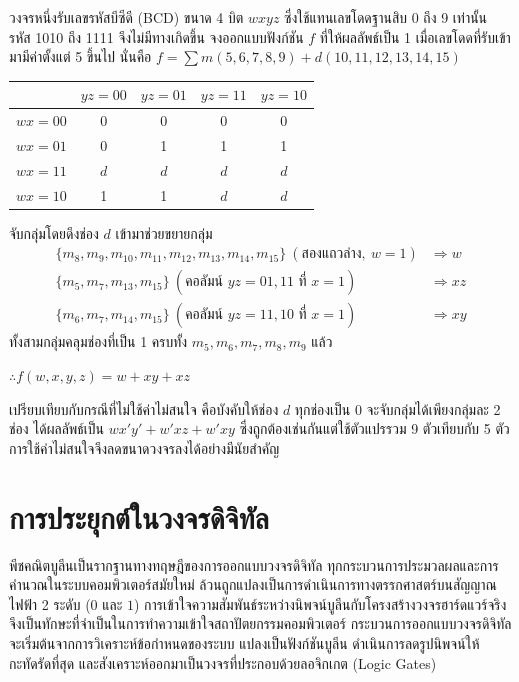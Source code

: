 \begin{ex}
\label{ex:kmap-dont-care}
วงจรหนึ่งรับเลขรหัสบีซีดี (BCD) ขนาด 4 บิต $wxyz$ ซึ่งใช้แทนเลขโดดฐานสิบ 0 ถึง 9 เท่านั้น รหัส 1010 ถึง 1111 จึงไม่มีทางเกิดขึ้น จงออกแบบฟังก์ชัน $f$ ที่ให้ผลลัพธ์เป็น 1 เมื่อเลขโดดที่รับเข้ามามีค่าตั้งแต่ 5 ขึ้นไป นั่นคือ $f = \sum m(5, 6, 7, 8, 9) + d(10, 11, 12, 13, 14, 15)$

\begin{center}
\begin{tabular}{|c|c|c|c|c|}
\hline
 & $yz = 00$ & $yz = 01$ & $yz = 11$ & $yz = 10$ \\
\hline
$wx = 00$ & 0 & 0 & 0 & 0 \\
\hline
$wx = 01$ & 0 & 1 & 1 & 1 \\
\hline
$wx = 11$ & $d$ & $d$ & $d$ & $d$ \\
\hline
$wx = 10$ & 1 & 1 & $d$ & $d$ \\
\hline
\end{tabular}
\end{center}
\end{ex}
\begin{solution}
จับกลุ่มโดยดึงช่อง $d$ เข้ามาช่วยขยายกลุ่ม
\begin{align*}
\{m_8, m_9, m_{10}, m_{11}, m_{12}, m_{13}, m_{14}, m_{15}\}\ (\text{สองแถวล่าง},\ w = 1) &\Rightarrow w\\
\{m_5, m_7, m_{13}, m_{15}\}\ (\text{คอลัมน์ } yz = 01, 11 \text{ ที่ } x = 1) &\Rightarrow xz\\
\{m_6, m_7, m_{14}, m_{15}\}\ (\text{คอลัมน์ } yz = 11, 10 \text{ ที่ } x = 1) &\Rightarrow xy
\end{align*}
ทั้งสามกลุ่มคลุมช่องที่เป็น 1 ครบทั้ง $m_5, m_6, m_7, m_8, m_9$ แล้ว

$\therefore f(w, x, y, z) = w + xy + xz$ \solhere

เปรียบเทียบกับกรณีที่ไม่ใช้ค่าไม่สนใจ คือบังคับให้ช่อง $d$ ทุกช่องเป็น 0 จะจับกลุ่มได้เพียงกลุ่มละ 2 ช่อง ได้ผลลัพธ์เป็น $w x' y' + w' x z + w' x y$ ซึ่งถูกต้องเช่นกันแต่ใช้ตัวแปรรวม 9 ตัวเทียบกับ 5 ตัว การใช้ค่าไม่สนใจจึงลดขนาดวงจรลงได้อย่างมีนัยสำคัญ
\end{solution}

\section{การประยุกต์ในวงจรดิจิทัล}
\label{sec:boolean-applications}

พีชคณิตบูลีนเป็นรากฐานทางทฤษฎีของการออกแบบวงจรดิจิทัล ทุกกระบวนการประมวลผลและการคำนวณในระบบคอมพิวเตอร์สมัยใหม่ ล้วนถูกแปลงเป็นการดำเนินการทางตรรกศาสตร์บนสัญญาณไฟฟ้า 2 ระดับ ($0$ และ $1$) การเข้าใจความสัมพันธ์ระหว่างนิพจน์บูลีนกับโครงสร้างวงจรฮาร์ดแวร์จริง จึงเป็นทักษะที่จำเป็นในการทำความเข้าใจสถาปัตยกรรมคอมพิวเตอร์ กระบวนการออกแบบวงจรดิจิทัลจะเริ่มต้นจากการวิเคราะห์ข้อกำหนดของระบบ แปลงเป็นฟังก์ชันบูลีน ดำเนินการลดรูปนิพจน์ให้กะทัดรัดที่สุด และสังเคราะห์ออกมาเป็นวงจรที่ประกอบด้วยลอจิกเกต (Logic Gates)~\parencite{gersting2014structures}

